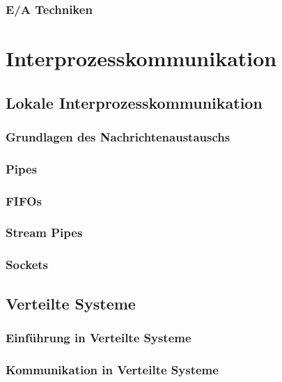 \documentclass{article}
\begin{document}
\subsubsection{E/A Techniken}

\newpage
\section{Interprozesskommunikation}
\subsection{Lokale Interprozesskommunikation}
\subsubsection{Grundlagen des Nachrichtenaustauschs}
\subsubsection{Pipes}
\subsubsection{FIFOs}
\subsubsection{Stream Pipes}
\subsubsection{Sockets}
\subsection{Verteilte Systeme}
\subsubsection{Einführung in Verteilte Systeme}
\subsubsection{Kommunikation in Verteilte Systeme}
\end{document}
